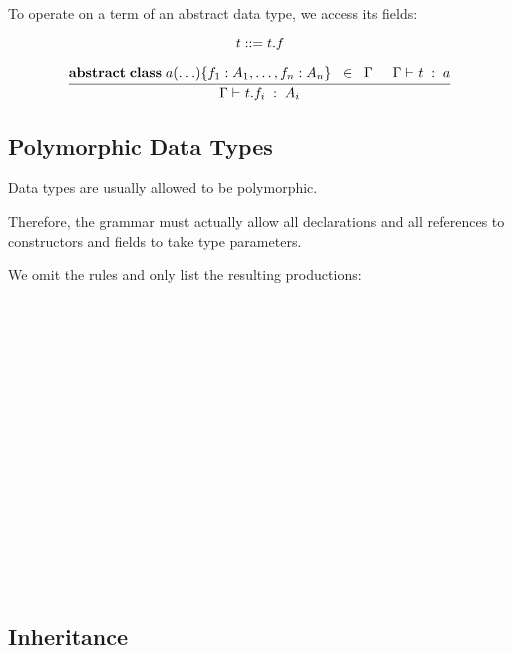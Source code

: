 To operate on a term of an abstract data type, we access its fields:

\[t ::= t.f\]

\[\rul{\aclassAI{a}{\ldots}{}{f_1:A_1,\ldots,f_n:A_n}\;\;\in\;\;\Gamma\tb
       \oftype{}{\Gamma}{t}{a}}
      {\oftype{}{\Gamma}{t.f_i}{A_i}}\]

\subsection{Polymorphic Data Types}

Data types are usually allowed to be polymorphic.

Therefore, the grammar must actually allow all declarations and all references to constructors and fields to take type parameters.

We omit the rules and only list the resulting productions:

\begin{commgrammar}
\\
\\
\\
\\
\\
\\
\\
\\
\\
\\
\\
\\
\\
\\
\\
\end{commgrammar}


\subsection{Inheritance}

